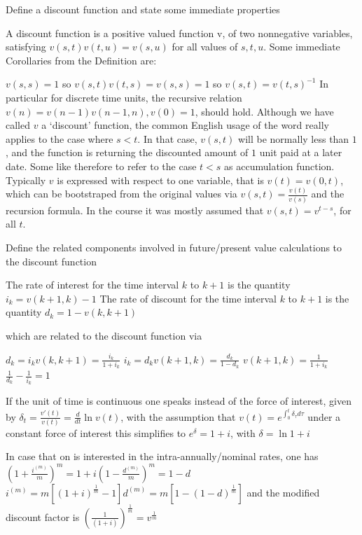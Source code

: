 \documentclass[11pt,a4paper,twoside]{article}
\begin{document}
Define a discount function and state some immediate properties


A discount function is a positive valued function v, of two nonnegative
variables, satisfying 
\( v(s, t)v(t, u) = v(s, u) \)
for all values of \( s, t, u \).
Some immediate Corollaries from the Definition are:

\( v(s, s) = 1 \) so
\( v(s, t)v(t, s) = v(s, s) = 1 \)
so
\( v(s, t) = v(t, s)^{-1} \)
In particular for discrete time units, the recursive relation 
\( v(n) = v(n-1)v(n-1, n), v(0) = 1\), should hold.
Although we have called \( v \) a ‘discount’ function, the common English usage of the word
really applies to the case where \( s < t \). In that case, \( v(s, t) \) will be normally less than \( 1 \), 
and the function is returning the discounted amount of \( 1 \) unit paid at a later date.
Some like therefore to refer to the case \( t < s \) as accumulation function.
Typically \( v \) is expressed with respect to one variable, that is \( v(t) = v(0, t) \),
which can be bootstraped from the original values via 
\( v(s, t) = \frac{v(t)}{v(s)} \) and the recursion formula.
In the course it was mostly assumed that \( v(s, t) = v^{t-s} \), for all \( t \).


Define the related components 
involved in future/present value calculations
to the discount function

The rate of interest for the time interval \( k \) to \( k + 1 \) is the quantity
\( i_k = v(k+1, k) - 1 \)
The rate of discount for the time interval \( k \) to \( k + 1 \) is the quantity
\( d_k = 1 - v(k, k+1) \)

which are related to the discount function via 

\( d_k = i_kv(k, k+1) = \frac{i_k}{1 + i_k} \)
\( i_k = d_kv(k+1, k) = \frac{d_k}{1 - d_k} \)
\( v(k+1, k) = \frac{1}{1 + i_k} \)
\( \frac{1}{d_k} - \frac{1}{i_k} = 1 \)

If the unit of time is continuous one speaks instead of the force of interest,
given by
\( \delta_t = \frac{v'(t)}{v(t)} = \frac{d}{dt}\ln{v(t)} \),
with the assumption that \( v(t) = e^{\int_0^t \delta_\tau d\tau}\)
under a constant force of interest this simplifies to
\( e^{\delta} = 1 + i \), with \( \delta = \ln{1 + i} \)

In case that on is interested in the intra-annually/nominal rates, one has
\(\left( 1 + \frac{i^{(m)}}{m} \right)^m = 1 + i \left( 1 - \frac{d^{(m)}}{m} \right)^m = 1 - d\)
\(i^{(m)} = m \left[ (1 + i)^{\frac{1}{m}} - 1 \right] d^{(m)} = m \left[ 1 - (1 - d)^{\frac{1}{m}} \right]\)
and the modified discount factor is
\( (\frac{1}{(1 + i)})^{\frac{1}{m}} = v^{\frac{1}{m}} \)
\end{document}
